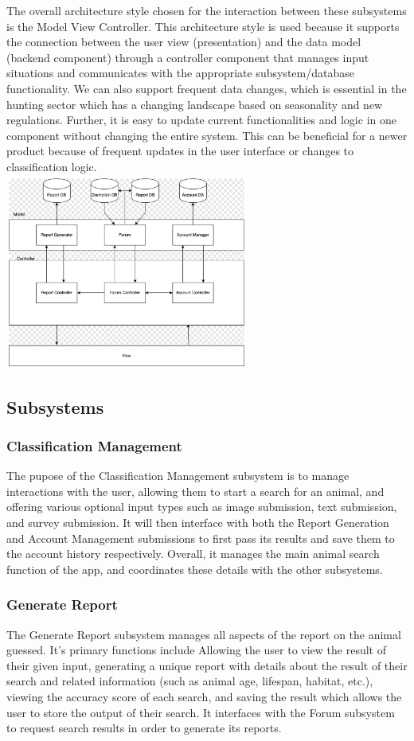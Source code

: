 \documentclass[]{article}
\begin{document}
The overall architecture style chosen for the interaction between these subsystems is the Model View Controller. This architecture style is used because it supports the connection between the user view (presentation) and the data model (backend component) through a controller component that manages input situations and communicates with the appropriate subsystem/database functionality. We can also support frequent data changes, which is essential in the hunting sector which has a changing landscape based on seasonality and new regulations. Further, it is easy to update current functionalities and logic in one component without changing the entire system. This can be beneficial for a newer product because of frequent updates in the user interface or changes to classification logic.  
\\

\includegraphics[width=0.6\textwidth]{architecture.png}

\subsection{Subsystems}
\label{sub:subsystems}
\subsubsection{Classification Management}
The pupose of the Classification Management subsystem is to manage interactions with the user, allowing them to start a search for an animal, and offering various optional input types such as image submission, text submission, and survey submission. It will then interface with both the Report Generation and Account Management submissions to first pass its results and save them to the account history respectively. Overall, it manages the main animal search function of the app, and coordinates these details with the other subsystems.
\subsubsection{Generate Report}
The Generate Report subsystem manages all aspects of the report on the animal guessed. It's primary functions include Allowing the user to view the result of their given input, generating a unique report with details about the result of their search and related information (such as animal age, lifespan, habitat, etc.), viewing the accuracy score of each search, and saving the result which allows the user to store the output of their search.
It interfaces with the Forum subsystem to request search results in order to generate its reports.
\end{document}
